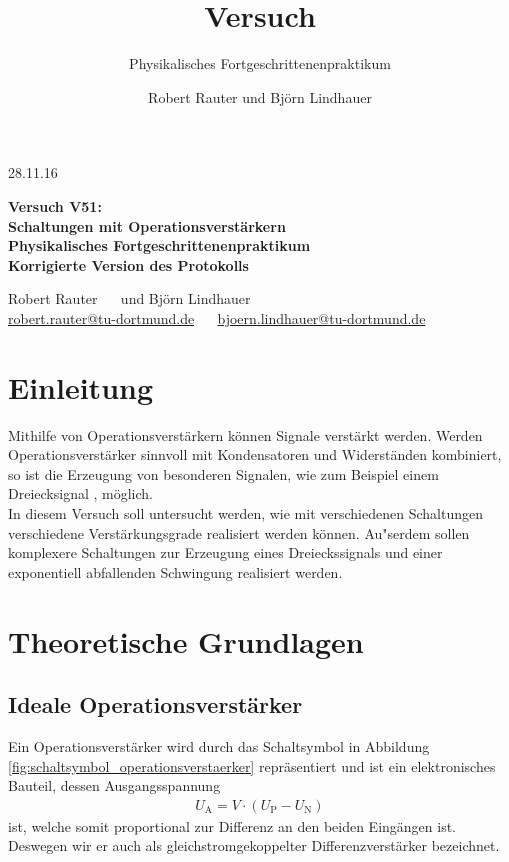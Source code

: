 \documentclass[]{scrartcl}
\title{Versuch \versuchnummer\\ \versuchname}
\subtitle{Physikalisches Fortgeschrittenenpraktikum}
\author{Robert Rauter und Björn Lindhauer}
\date{\versuchdatum}
\newcommand{\versuchnummer}{V51}
\newcommand{\versuchname}{Schaltungen mit Operationsverstärkern}
\newcommand{\versuchdatum}{28.11.16}
\let\oldsection\section
\renewcommand\section{\clearpage\oldsection}
\begin{document}
\begin{titlepage}
{\large \versuchdatum}
\vspace{7cm}
\begin{center}
\textbf{\huge Versuch \versuchnummer:}\\
\vspace{0.5cm}
\textbf{\huge \versuchname}\\
\vspace{0.2cm}
\textbf{ Physikalisches Fortgeschrittenenpraktikum}\\
\vspace{0.2cm}
\textbf{Korrigierte Version des Protokolls}\\
\vspace{9cm}

{\Large Robert Rauter \ \ \hspace{1.5cm} und \hspace{1.5cm} Björn Lindhauer}\\
{ \url{robert.rauter@tu-dortmund.de} \ \ \hspace{2cm} \url{bjoern.lindhauer@tu-dortmund.de}}
\end{center}
\end{titlepage}

\tableofcontents

\section{Einleitung}
Mithilfe von Operationsverstärkern können Signale verstärkt werden. Werden Operationsverstärker sinnvoll mit Kondensatoren und Widerständen kombiniert, so ist die Erzeugung von besonderen Signalen, wie zum Beispiel einem Dreiecksignal , möglich. \\
In diesem Versuch soll untersucht werden, wie mit verschiedenen Schaltungen verschiedene Verstärkungsgrade realisiert werden können. Au"serdem sollen komplexere Schaltungen zur Erzeugung eines Dreieckssignals und einer exponentiell abfallenden Schwingung realisiert werden.

\section{Theoretische Grundlagen}
\subsection{Ideale Operationsverstärker}
Ein Operationsverstärker wird durch das Schaltsymbol in Abbildung  \ref{fig:schaltsymbol_operationsverstaerker} repräsentiert und ist ein elektronisches Bauteil, dessen Ausgangsspannung
\begin{align}
 U_{\text{A}}=V\cdot \left( U_{\text{P}}-U_{\text{N}} \right)
\end{align}
ist, welche somit proportional zur Differenz an den beiden Eingängen ist.
Deswegen wir er auch als gleichstromgekoppelter Differenzverstärker bezeichnet.
\end{document}
